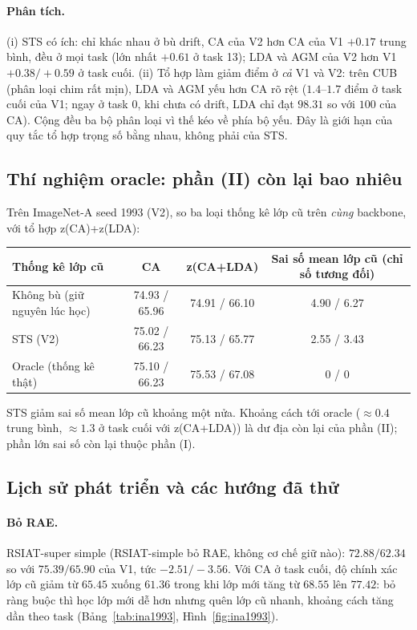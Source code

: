 \documentclass[11pt]{article}
\begin{document}
\paragraph{Phân tích.} (i) STS có ích: chỉ khác nhau ở bù drift, CA của V2 hơn CA của V1 $+0.17$ trung bình, đều ở
mọi task (lớn nhất $+0.61$ ở task 13); LDA và AGM của V2 hơn V1 $+0.38/+0.59$ ở task cuối. (ii) Tổ hợp làm giảm điểm
ở \emph{cả} V1 và V2: trên CUB (phân loại chim rất mịn), LDA và AGM yếu hơn CA rõ rệt ($1.4$--$1.7$ điểm ở task cuối
của V1; ngay ở task 0, khi chưa có drift, LDA chỉ đạt $98.31$ so với $100$ của CA). Cộng đều ba bộ phân loại vì thế kéo
về phía bộ yếu. Đây là giới hạn của quy tắc tổ hợp trọng số bằng nhau, không phải của STS.

\subsection{Thí nghiệm oracle: phần (II) còn lại bao nhiêu}\label{sec:oracle}
Trên ImageNet-A seed 1993 (V2), so ba loại thống kê lớp cũ trên \emph{cùng} backbone, với tổ hợp z(CA)+z(LDA):

\begin{table}[H]
\centering\small
\begin{tabular}{lccc}
\toprule
Thống kê lớp cũ & CA & z(CA+LDA) & Sai số mean lớp cũ (chỉ số tương đối) \\
\midrule
Không bù (giữ nguyên lúc học) & 74.93 / 65.96 & 74.91 / 66.10 & 4.90 / 6.27 \\
STS (V2) & 75.02 / 66.23 & 75.13 / 65.77 & 2.55 / 3.43 \\
Oracle (thống kê thật) & 75.10 / 66.23 & 75.53 / 67.08 & 0 / 0 \\
\bottomrule
\end{tabular}
\end{table}
STS giảm sai số mean lớp cũ khoảng một nửa. Khoảng cách tới oracle ($\approx0.4$ trung bình, $\approx1.3$ ở task
cuối với z(CA+LDA)) là dư địa còn lại của phần (II); phần lớn sai số còn lại thuộc phần (I).

\subsection{Lịch sử phát triển và các hướng đã thử}\label{sec:history}

\paragraph{Bỏ RAE.} RSIAT-super simple (RSIAT-simple bỏ RAE, không cơ chế giữ nào): $72.88/62.34$ so với $75.39/65.90$
của V1, tức $-2.51/-3.56$. Với CA ở task cuối, độ chính xác lớp cũ giảm từ $65.45$ xuống $61.36$ trong khi lớp mới tăng từ
$68.55$ lên $77.42$: bỏ ràng buộc thì học lớp mới dễ hơn nhưng quên lớp cũ nhanh, khoảng cách tăng dần theo task
(Bảng~\ref{tab:ina1993}, Hình~\ref{fig:ina1993}).
\end{document}

